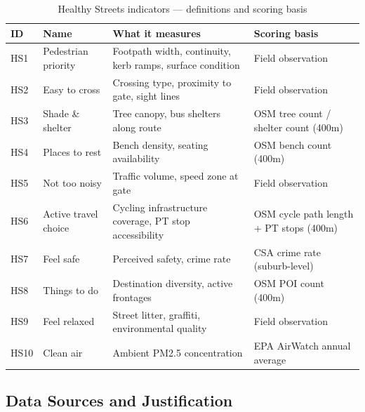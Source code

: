 \documentclass[11pt,a4paper]{article}
\begin{document}
\begin{table}[H]\centering\small
\caption{Healthy Streets indicators — definitions and scoring basis}
\setlength{\tabcolsep}{4pt}
\begin{tabular}{C{0.7cm}L{3cm}L{5.5cm}L{4.8cm}}
\toprule
\textbf{ID} & \textbf{Name} & \textbf{What it measures} & \textbf{Scoring basis} \\
\midrule
HS1 & Pedestrian priority & Footpath width, continuity, kerb ramps, surface condition & Field observation \\
HS2 & Easy to cross & Crossing type, proximity to gate, sight lines & Field observation \\
HS3 & Shade \& shelter & Tree canopy, bus shelters along route & OSM tree count / shelter count (400m) \\
HS4 & Places to rest & Bench density, seating availability & OSM bench count (400m) \\
HS5 & Not too noisy & Traffic volume, speed zone at gate & Field observation \\
HS6 & Active travel choice & Cycling infrastructure coverage, PT stop accessibility & OSM cycle path length + PT stops (400m) \\
HS7 & Feel safe & Perceived safety, crime rate & CSA crime rate (suburb-level) \\
HS8 & Things to do & Destination diversity, active frontages & OSM POI count (400m) \\
HS9 & Feel relaxed & Street litter, graffiti, environmental quality & Field observation \\
HS10 & Clean air & Ambient PM2.5 concentration & EPA AirWatch annual average \\
\bottomrule
\end{tabular}
\end{table}

\subsection{Data Sources and Justification}
\end{document}
